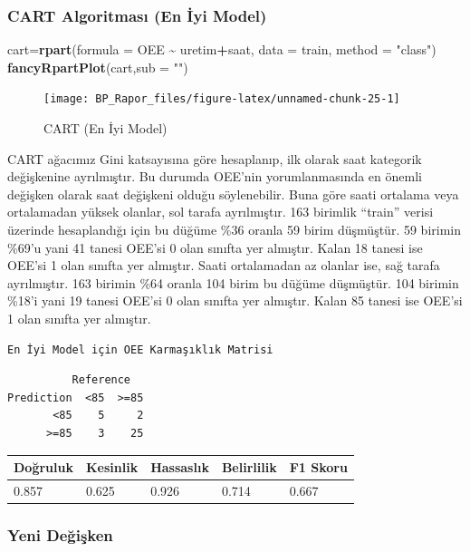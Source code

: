 \documentclass[12pt,twoside]{deuthesis}
\newenvironment{Shaded}{\begin{snugshade}}{\end{snugshade}}
\newcommand{\DataTypeTok}[1]{\textcolor[rgb]{0.13,0.29,0.53}{#1}}
\newcommand{\KeywordTok}[1]{\textcolor[rgb]{0.13,0.29,0.53}{\textbf{#1}}}
\newcommand{\NormalTok}[1]{#1}
\newcommand{\OperatorTok}[1]{\textcolor[rgb]{0.81,0.36,0.00}{\textbf{#1}}}
\newcommand{\StringTok}[1]{\textcolor[rgb]{0.31,0.60,0.02}{#1}}
\begin{document}
\hypertarget{cart-algoritmasux131-en-iux307yi-model}{%
\subsubsection{CART Algoritması (En İyi Model)}\label{cart-algoritmasux131-en-iux307yi-model}}
\begin{Shaded}
\begin{Highlighting}[]
\NormalTok{cart=}\KeywordTok{rpart}\NormalTok{(}\DataTypeTok{formula =}\NormalTok{ OEE }\OperatorTok{\textasciitilde{}}\StringTok{ }\NormalTok{uretim}\OperatorTok{+}\NormalTok{saat, }\DataTypeTok{data =}\NormalTok{ train, }\DataTypeTok{method =} \StringTok{"class"}\NormalTok{)}
\KeywordTok{fancyRpartPlot}\NormalTok{(cart,}\DataTypeTok{sub =} \StringTok{""}\NormalTok{)}
\end{Highlighting}
\end{Shaded}
\begin{figure}

{\centering \texttt{[image: BP\_Rapor\_files/figure-latex/unnamed-chunk-25-1]} 

}

\caption{CART (En İyi Model)}\label{fig:unnamed-chunk-25}
\end{figure}
CART ağacımız Gini katsayısına göre hesaplanıp, ilk olarak saat kategorik değişkenine ayrılmıştır. Bu durumda OEE'nin yorumlanmasında en önemli değişken olarak saat değişkeni olduğu söylenebilir. Buna göre saati ortalama veya ortalamadan yüksek olanlar, sol tarafa ayrılmıştır. 163 birimlik ``train'' verisi üzerinde hesaplandığı için bu düğüme \%36 oranla 59 birim düşmüştür. 59 birimin \%69'u yani 41 tanesi OEE'si 0 olan sınıfta yer almıştır. Kalan 18 tanesi ise OEE'si 1 olan sınıfta yer almıştır. Saati ortalamadan az olanlar ise, sağ tarafa ayrılmıştır. 163 birimin \%64 oranla 104 birim bu düğüme düşmüştür. 104 birimin \%18'i yani 19 tanesi OEE'si 0 olan sınıfta yer almıştır. Kalan 85 tanesi ise OEE'si 1 olan sınıfta yer almıştır.
\begin{verbatim}
En İyi Model için OEE Karmaşıklık Matrisi 
\end{verbatim}
\begin{verbatim}
          Reference
Prediction  <85  >=85
       <85    5     2
      >=85    3    25
\end{verbatim}
\begin{longtable}[]{@{}lllll@{}}
\toprule
Doğruluk & Kesinlik & Hassaslık & Belirlilik & F1 Skoru\tabularnewline
\midrule
\endhead
0.857 & 0.625 & 0.926 & 0.714 & 0.667\tabularnewline
\bottomrule
\end{longtable}
\hypertarget{yeni-deux11fiux15fken}{%
\subsubsection{Yeni Değişken}\label{yeni-deux11fiux15fken}}
\end{document}
